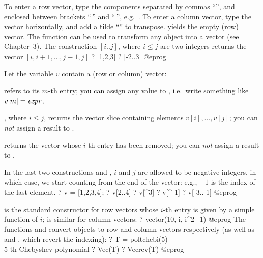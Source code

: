 %
To enter a row vector, type the components separated by commas ``\kbd{,}'',
and enclosed between brackets ``\kbd{[}$\,$'' and ``$\,$\kbd{]}'',
e.g.~\kbd{[1,2,3]}. To enter a column vector, type the vector horizontally,
and add a tilde ``\til'' to transpose. \kbd{[ ]} yields the empty (row)
vector. The function  can be used to transform any object into a
vector (see Chapter~3). The construction $[i..j]$, where $i \leq j$ are two
integers returns the vector $[i, i+1,\dots, j-1, j]$
\bprog
? [1,2,3]
? [-2..3]
@eprog

Let the variable $v$ contain a (row or column) vector:

\item {} refers to its $m$-th entry; you can assign any value to
,  i.e.~write something like $v[m]=\hbox{\it expr\/}$.

\item {}, where $i \leq j$, returns the vector slice containing
elements $v[i],\dots, v[j]$; you can \emph{not} assign a result to
.

\item {} returns the vector whose $i$-th entry has been removed;
you can \emph{not} assign a result to .

\noindent In the last two constructions  and ,
$i$ and $j$ are allowed to be negative integers, in which case, we start
counting from the end of the vector: e.g., $-1$ is the index of the last
element.
\bprog
? v = [1,2,3,4];
? v[2..4]
? v[^3]
? v[^-1]
? v[-3..-1]
@eprog

  is the standard constructor for row vectors
 whose $i$-th entry is given by a simple function of $i$; 
 is similar for column vectors:
 \bprog
 ? vector(10, i, i^2+1)
 @eprog
 The functions  and  convert objects to row and column
vectors respectively (as well as  and , which revert
the indexing):
 \bprog
 ? T = poltchebi(5)   \\ 5-th Chebyshev polynomial
 ? Vec(T)
 ? Vecrev(T)
 @eprog

